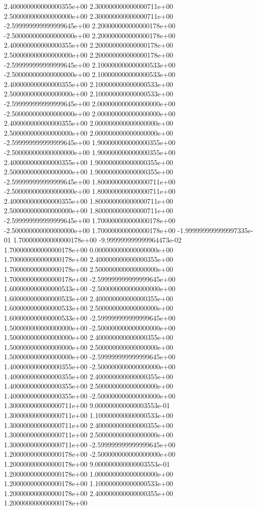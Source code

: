2.400000000000000355e+00 2.300000000000000711e+00
2.500000000000000000e+00 2.300000000000000711e+00
-2.599999999999999645e+00 2.200000000000000178e+00
-2.500000000000000000e+00 2.200000000000000178e+00
2.400000000000000355e+00 2.200000000000000178e+00
2.500000000000000000e+00 2.200000000000000178e+00
-2.599999999999999645e+00 2.100000000000000533e+00
-2.500000000000000000e+00 2.100000000000000533e+00
2.400000000000000355e+00 2.100000000000000533e+00
2.500000000000000000e+00 2.100000000000000533e+00
-2.599999999999999645e+00 2.000000000000000000e+00
-2.500000000000000000e+00 2.000000000000000000e+00
2.400000000000000355e+00 2.000000000000000000e+00
2.500000000000000000e+00 2.000000000000000000e+00
-2.599999999999999645e+00 1.900000000000000355e+00
-2.500000000000000000e+00 1.900000000000000355e+00
2.400000000000000355e+00 1.900000000000000355e+00
2.500000000000000000e+00 1.900000000000000355e+00
-2.599999999999999645e+00 1.800000000000000711e+00
-2.500000000000000000e+00 1.800000000000000711e+00
2.400000000000000355e+00 1.800000000000000711e+00
2.500000000000000000e+00 1.800000000000000711e+00
-2.599999999999999645e+00 1.700000000000000178e+00
-2.500000000000000000e+00 1.700000000000000178e+00
-1.999999999999997335e-01 1.700000000000000178e+00
-9.999999999999964473e-02 1.700000000000000178e+00
0.000000000000000000e+00 1.700000000000000178e+00
2.400000000000000355e+00 1.700000000000000178e+00
2.500000000000000000e+00 1.700000000000000178e+00
-2.599999999999999645e+00 1.600000000000000533e+00
-2.500000000000000000e+00 1.600000000000000533e+00
2.400000000000000355e+00 1.600000000000000533e+00
2.500000000000000000e+00 1.600000000000000533e+00
-2.599999999999999645e+00 1.500000000000000000e+00
-2.500000000000000000e+00 1.500000000000000000e+00
2.400000000000000355e+00 1.500000000000000000e+00
2.500000000000000000e+00 1.500000000000000000e+00
-2.599999999999999645e+00 1.400000000000000355e+00
-2.500000000000000000e+00 1.400000000000000355e+00
2.400000000000000355e+00 1.400000000000000355e+00
2.500000000000000000e+00 1.400000000000000355e+00
-2.500000000000000000e+00 1.300000000000000711e+00
9.000000000000003553e-01 1.300000000000000711e+00
1.100000000000000533e+00 1.300000000000000711e+00
2.400000000000000355e+00 1.300000000000000711e+00
2.500000000000000000e+00 1.300000000000000711e+00
-2.599999999999999645e+00 1.200000000000000178e+00
-2.500000000000000000e+00 1.200000000000000178e+00
9.000000000000003553e-01 1.200000000000000178e+00
1.000000000000000000e+00 1.200000000000000178e+00
1.100000000000000533e+00 1.200000000000000178e+00
2.400000000000000355e+00 1.200000000000000178e+00
